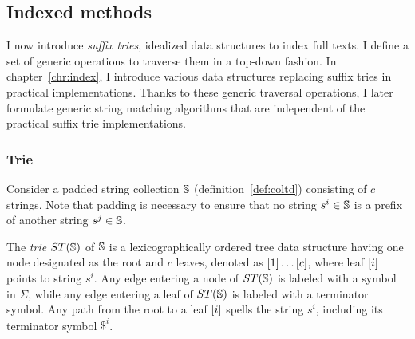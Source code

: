 %




\subsection{Indexed methods}
\label{sub:introindex}

I now introduce \emph{suffix tries}, idealized data structures to index full texts.
I define a set of generic operations to traverse them in a top-down fashion.
In chapter~\ref{chr:index}, I introduce various data structures replacing suffix tries in practical implementations.
Thanks to these generic traversal operations, I later formulate generic string matching algorithms that are independent of the practical suffix trie implementations.

\subsubsection{Trie}

Consider a padded string collection $\mathbb{S}$ (definition~\ref{def:coltd}) consisting of $c$ strings.
Note that padding is necessary to ensure that no string $s^i \in \mathbb{S}$ is a prefix of another string $s^j \in \mathbb{S}$.
\begin{definition}
The \emph{trie} $ST(\mathbb{S})$ of $\mathbb{S}$ is a lexicographically ordered tree data structure having one node designated as the root and $c$ leaves, denoted as $[1] \dots [c]$, where leaf $[i]$ points to string $s^i$.
Any edge entering a node of $ST(\mathbb{S})$ is labeled with a symbol in $\Sigma$, while any edge entering a leaf of $ST(\mathbb{S})$ is labeled with a terminator symbol.
Any path from the root to a leaf $[i]$ spells the string $s^i$, including its terminator symbol $\$^i$.
\end{definition}

